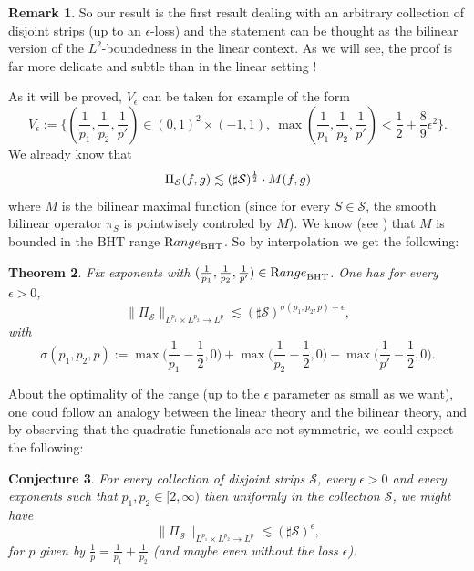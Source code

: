 \documentclass[a4paper,11pt,oneside]{amsart}
\newcommand{\BHT}{{\textrm{BHT}}}
\theoremstyle{plain}
\newtheorem{theorem}{Theorem}[section]
\newtheorem{conjecture}[theorem]{Conjecture}
\theoremstyle{definition}
\newtheorem{remark}[theorem]{Remark}
\begin{document}
\begin{remark} So our result is the first result dealing with an arbitrary collection of disjoint strips (up to an $\epsilon$-loss) and the statement can be thought as the bilinear version of the $L^2$-boundedness in the linear context. As we will see, the proof is far more delicate and subtle than in the linear setting !
\end{remark}

As it will be proved, $V_{\epsilon}$ can be taken for example of the form
$$ V_{\epsilon}:=\{(\frac{1}{p_1},\frac{1}{p_2},\frac{1}{p'})\in(0,1)^2 \times (-1,1),\ \max(\frac{1}{p_1},\frac{1}{p_2},\frac{1}{p'}) < \frac{1}{2}+\frac{8}{9}\epsilon^2\}.$$
We already know that
$$ \Pi_{\mathcal S}(f,g) \lesssim (\sharp {\mathcal S})^{1 \over 2} \cdot M(f,g)$$
where $M$ is the bilinear maximal function (since for every $S\in {\mathcal S}$, the smooth bilinear operator $\pi_{S}$ is pointwisely controled by $M$).
We know (see \cite{Lacey}) that $M$ is bounded in the $\BHT$ range ${\textrm Range}_{\BHT}$. So by interpolation we get the following:

\begin{theorem} \label{thm:main2} Fix exponents with $(\frac{1}{p_1},\frac{1}{p_2},\frac{1}{p'})\in {\textrm Range}_{\BHT}$. One has for every $\epsilon>0$,
$$ \| \Pi_{\mathcal S} \|_{L^{p_1} \times L^{p_2} \to L^p} \lesssim (\sharp {\mathcal S})^{\sigma(p_1,p_2,p) + \epsilon},$$
with
$$ \sigma(p_1,p_2,p):=\max\Big(\frac{1}{p_1}-\frac{1}{2},0\Big) + \max\Big(\frac{1}{p_2}-\frac{1}{2},0\Big) + \max\Big(\frac{1}{p'}-\frac{1}{2},0\Big).$$
\end{theorem}

About the optimality of the range (up to the $\epsilon$ parameter as small as we want), one coud follow an analogy between the linear theory and the bilinear theory, and  by observing that the quadratic functionals are not symmetric, we could expect the following:

\begin{conjecture} For every collection of disjoint strips ${\mathcal S}$, every $\epsilon>0$ and every exponents such that $p_1,p_2\in [2,\infty)$ then uniformly in the collection ${\mathcal S}$, we might have
$$ \| \Pi_{\mathcal S} \|_{L^{p_1} \times L^{p_2} \to L^p} \lesssim (\sharp {\mathcal S})^{\epsilon},$$
for $p$ given by $\frac{1}{p}=\frac{1}{p_1}+\frac{1}{p_2}$ (and maybe even without the loss $\epsilon$).
\end{conjecture}
\end{document}
